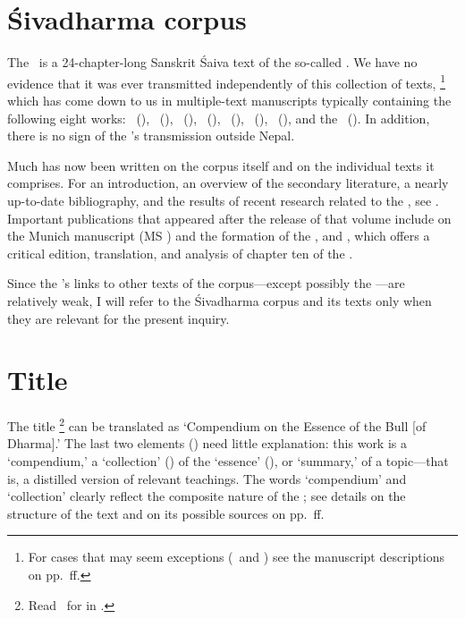 

\thispagestyle{empty}
\frenchspacing

\section{Śivadharma corpus}
\fancyhead[LE]{}
\fancyhead[RE]{}
\fancyhead[LO]{}
\fancyhead[RO]{}

The \Vss\ is a 24-chapter-long Sanskrit Śaiva text of the 
so-called \Sivadharmacorpus.  We have no evidence that it
was ever transmitted independently of this collection of texts,%
		\footnote{For cases that may seem exceptions 
		(\msKOb\ and \msPaperA)
                see the manuscript descriptions
                on pp.~\pageref{mss_descr}ff.}
which has come down to us in multiple-text manuscripts typically containing the following eight works:
\SDhS\ (\SDHS), \SDhU\ (\SDHU), \SDhSangr\ (\SDHSANGR),
\Ums\ (\UMS), \Uums\ (\UUMS), \Vss\ (\VSS), \DharmP\ (\DHARMP), and the \SivaUp\ (\SIVAUP).
In addition, there is no sign of the \VSS's transmission outside Nepal.

Much has now been written on the corpus itself and on the individual texts it comprises. 
For an introduction, an overview of the secondary literature, 
a nearly up-to-date bibliography, and the results of recent research related to the \Sivadharma,
see . Important publications that appeared after the release of that volume
include  on the Munich manuscript (MS \msM) and the formation of the \Sivadharmacorpus,
and , which offers a critical edition, translation, and analysis of chapter ten of the 
\SDhS.


Since the \VSS's links to other texts of the corpus---except possibly the 
\DharmP---are relatively weak, I will refer to the Śivadharma corpus and
its texts only when they are relevant for the present inquiry.



\section{Title}\label{title}
The title \Vss%
	\footnote{Read \Vss\ for 
	in .}
can be translated as `Compendium on the Essence of the Bull [of Dharma].'
The last two elements () need
little explanation: this work is a `compendium,' a `collection' ()
of the `essence' (), or `summary,' of a topic---that is, a distilled
version of relevant teachings.
The words `compendium' and `collection' clearly reflect the composite nature of
the \VSS; see details on the structure of the text and
on its possible sources on pp.~\pageref{structure}ff.

